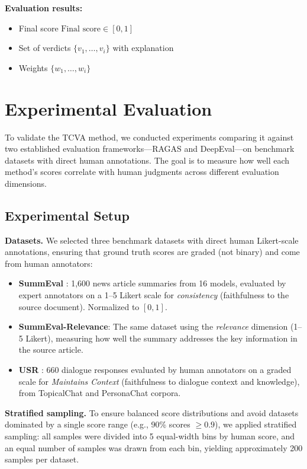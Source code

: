 \documentclass[sn-basic]{sn-jnl}
\theoremstyle{thmstyleone}%
\theoremstyle{thmstyletwo}%
\theoremstyle{thmstylethree}%
\begin{document}
\textbf{Evaluation results:}
\begin{itemize}
\item Final score $\text{Final score} \in [0, 1]$
\item Set of verdicts $\{v_1, \ldots, v_i\}$ with explanation
\item Weights $\{w_1, \ldots, w_i\}$
\end{itemize}

\section{Experimental Evaluation}

To validate the TCVA method, we conducted experiments comparing it against two established evaluation frameworks---RAGAS \cite{Es2023} and DeepEval---on benchmark datasets with direct human annotations. The goal is to measure how well each method's scores correlate with human judgments across different evaluation dimensions.

\subsection{Experimental Setup}

\textbf{Datasets.} We selected three benchmark datasets with direct human Likert-scale annotations, ensuring that ground truth scores are graded (not binary) and come from human annotators:

\begin{itemize}
\item \textbf{SummEval} \cite{Fabbri2021}: 1,600 news article summaries from 16 models, evaluated by expert annotators on a 1--5 Likert scale for \textit{consistency} (faithfulness to the source document). Normalized to $[0, 1]$.
\item \textbf{SummEval-Relevance}: The same dataset using the \textit{relevance} dimension (1--5 Likert), measuring how well the summary addresses the key information in the source article.
\item \textbf{USR} \cite{Mehri2020}: 660 dialogue responses evaluated by human annotators on a graded scale for \textit{Maintains Context} (faithfulness to dialogue context and knowledge), from TopicalChat and PersonaChat corpora.
\end{itemize}

\textbf{Stratified sampling.} To ensure balanced score distributions and avoid datasets dominated by a single score range (e.g., 90\% scores $\geq 0.9$), we applied stratified sampling: all samples were divided into 5 equal-width bins by human score, and an equal number of samples was drawn from each bin, yielding approximately 200 samples per dataset.
\end{document}
